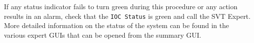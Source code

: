 \documentclass[12pt]{report}
\begin{document}
If any status indicator fails to turn green during this procedure or any action results in an alarm, check that the \texttt{IOC Status} is green and call the SVT Expert.  More detailed information on the status of the system can be found in the various expert GUIs that can be opened from the summary GUI.

%
%
%
%
%
\end{document}
